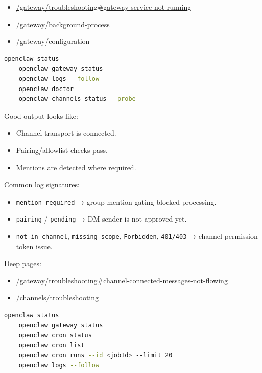 \begin{itemize}
  \item \href{/gateway/troubleshooting\#gateway-service-not-running}{/gateway/troubleshooting\#gateway-service-not-running}
  \item \href{/gateway/background-process}{/gateway/background-process}
  \item \href{/gateway/configuration}{/gateway/configuration}
\end{itemize}



\begin{lstlisting}[language=bash]
    openclaw status
    openclaw gateway status
    openclaw logs --follow
    openclaw doctor
    openclaw channels status --probe
\end{lstlisting}


Good output looks like:

\begin{itemize}
  \item Channel transport is connected.
  \item Pairing/allowlist checks pass.
  \item Mentions are detected where required.
\end{itemize}


Common log signatures:

\begin{itemize}
  \item \texttt{mention required} → group mention gating blocked processing.
  \item \texttt{pairing} / \texttt{pending} → DM sender is not approved yet.
  \item \texttt{not\_in\_channel}, \texttt{missing\_scope}, \texttt{Forbidden}, \texttt{401/403} → channel permission token issue.
\end{itemize}


Deep pages:

\begin{itemize}
  \item \href{/gateway/troubleshooting\#channel-connected-messages-not-flowing}{/gateway/troubleshooting\#channel-connected-messages-not-flowing}
  \item \href{/channels/troubleshooting}{/channels/troubleshooting}
\end{itemize}



\begin{lstlisting}[language=bash]
    openclaw status
    openclaw gateway status
    openclaw cron status
    openclaw cron list
    openclaw cron runs --id <jobId> --limit 20
    openclaw logs --follow
\end{lstlisting}


